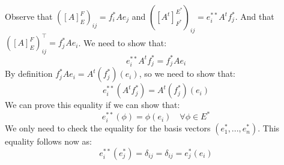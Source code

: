 
Observe that $([A]_E^F)_{ij}=f_i^*Ae_j$ and $([A^t]_{F^*}^{E^*})_{ij}=e_i^{**}A^tf_j^*$. And that $([A]_E^F)^\top_{ij}=f_j^*Ae_i$. We need to show that:
\[e_i^{**}A^tf_j^*=f_j^*Ae_i\]
By definition $f_j^*Ae_i=A^t(f_j^*)(e_i)$, so we need to show that:
\[e_i^{**}(A^tf_j^*)=A^t(f_j^*)(e_i)\]
We can prove this equality if we can show that:
\[e_i^{**}(\phi)=\phi(e_i) \quad \forall \phi \in E^*\] 
We only need to check the equality for the basis vectors $(e_1^*,...,e_n^*)$. This equality follows now as:
\[e_i^{**}(e_j^*)=\delta_{ij}=\delta_{ij}=e_j^*(e_i)\]